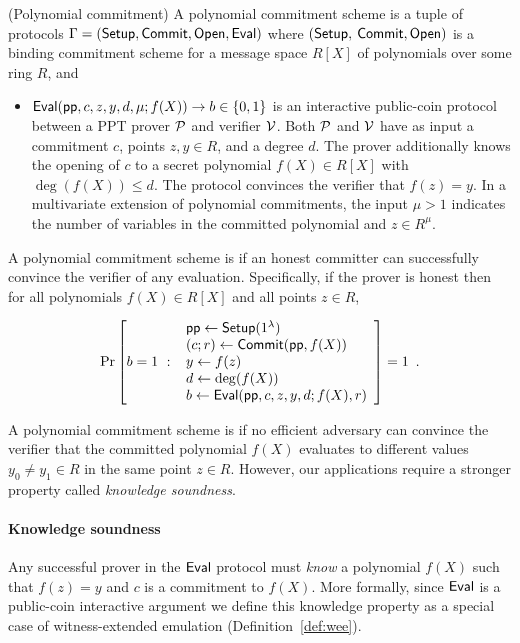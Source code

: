 \begin{definition} (Polynomial commitment) 
A polynomial commitment scheme is a tuple of protocols $\Gamma = (\textsf{{Setup}}, \textsf{{Commit}}, \textsf{{Open}}, \textsf{{Eval}})$ where $(\textsf{{Setup}},$ $\textsf{{Commit}}, \textsf{{Open}})$ is a binding commitment scheme for a message space $R[X]$ of polynomials over some ring $R$, and
\begin{itemize}
    \item $\textsf{{Eval}}(\textsf{pp}, c, z, y, d, \mu; f(X)) \rightarrow b \in \{0, 1\}$ is an interactive public-coin protocol between a PPT prover $\mathcal{P}$ and verifier $\mathcal{V}$. Both $\mathcal{P}$ and $\mathcal{V}$ have as input a commitment $c$, points $z, y \in R$, and a degree $d$. The prover additionally knows the opening of $c$ to a secret polynomial $f(X) \in R[X]$ with $\deg(f(X)) \leq d$. The protocol convinces the verifier that $f(z) = y$. {In a multivariate extension of polynomial commitments, the input $\mu > 1$ indicates the number of variables in the committed polynomial} and $z \in R^\mu$.
\end{itemize}

A polynomial commitment scheme is  if an honest committer can successfully convince the verifier of any evaluation. 
Specifically, if the prover is honest then for all polynomials $f(X) \in R[X]$ and all points $z \in R$,
\begin{small}
\[
    \Pr\left[b = 1 \ : \ \begin{array}{l}
        \textsf{pp} \gets \textsf{{Setup}}(1^\lambda) \\
        (c; r) \gets \textsf{{Commit}}(\textsf{pp}, f(X)) \\
        y \gets f(z) \\
        d \gets \deg(f(X)) \\
        b \gets \textsf{{Eval}}(\textsf{pp}, c, z, y, d; f(X), r) \\
    \end{array} \right] = 1 \enspace .
\]
\end{small}

A polynomial commitment scheme is  if no efficient adversary can convince the verifier that the committed polynomial $f(X)$ evaluates to different values $y_0 \neq y_1 \in R$ in the same point $z \in R$. However, our applications require a stronger property called \emph{knowledge soundness}. 

\end{definition}

\paragraph{Knowledge soundness}
Any successful prover in the $\textsf{{Eval}}$ protocol must \emph{know} a polynomial $f(X)$ such that $f(z) = y$ and $c$ is a commitment to $f(X)$. More formally, since $\textsf{{Eval}}$ is a public-coin interactive argument we define this knowledge property as a special case of witness-extended emulation (Definition~\ref{def:wee}). 


